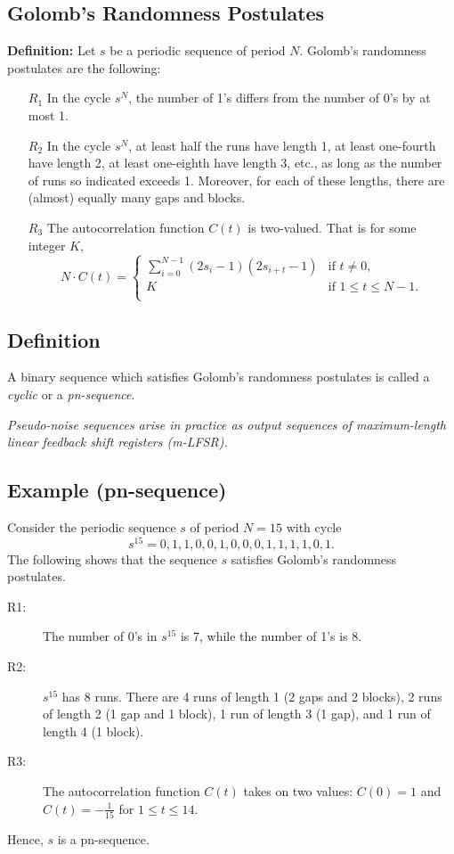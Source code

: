 \documentclass[12pt,openany]{book}
\theoremstyle{definition}
\begin{document}
	\subsection*{Golomb’s Randomness Postulates}
	\textbf{Definition:} Let \( s \) be a periodic sequence of period \( N \). Golomb’s randomness postulates are the following:
	\begin{enumerate}
		\item[\( R_1 \)] In the cycle \( s^N \), the number of 1’s differs from the number of 0’s by at most 1.
		\item[\( R_2 \)] In the cycle \( s^N \), at least half the runs have length 1, at least one-fourth have length 2, at least one-eighth have length 3, etc., as long as the number of runs so indicated exceeds 1. Moreover, for each of these lengths, there are (almost) equally many gaps and blocks.
		\item[\( R_3 \)] The autocorrelation function \( C(t) \) is two-valued. That is for some integer \( K \),
		\[ N \cdot C(t) = \begin{cases} 
			\sum_{i=0}^{N-1} (2s_i - 1)(2s_{i+t} - 1) & \text{if } t \neq 0, \\
			K & \text{if } 1 \leq t \leq N - 1. \\
		\end{cases} \]
	\end{enumerate}
	
\subsection*{Definition}
A binary sequence which satisfies Golomb's randomness postulates is called a \textit{cyclic} or a \textit{pn-sequence}.

\textit{Pseudo-noise sequences arise in practice as output sequences of maximum-length linear feedback shift registers (m-LFSR).}

\subsection*{Example (pn-sequence)}
Consider the periodic sequence \( s \) of period \( N = 15 \) with cycle
\[ s^{15} = 0, 1, 1, 0, 0, 1, 0, 0, 0, 1, 1, 1, 1, 0, 1. \]
The following shows that the sequence \( s \) satisfies Golomb's randomness postulates.
\begin{description}
	\item[R1:] The number of 0's in \( s^{15} \) is 7, while the number of 1's is 8.
	\item[R2:] \( s^{15} \) has 8 runs. There are 4 runs of length 1 (2 gaps and 2 blocks), 2 runs of length 2 (1 gap and 1 block), 1 run of length 3 (1 gap), and 1 run of length 4 (1 block).
	\item[R3:] The autocorrelation function \( C(t) \) takes on two values: \( C(0) = 1 \) and \( C(t) = -\frac{1}{15} \) for \( 1 \leq t \leq 14 \).
\end{description}
Hence, \( s \) is a pn-sequence.
\end{document}
